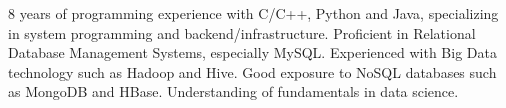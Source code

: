

\begin{cvparagraph}

8 years of programming experience with C/C++, Python and
Java, specializing in system programming and
backend/infrastructure. Proficient in Relational Database Management
Systems, especially MySQL. Experienced with Big Data technology such
as Hadoop and Hive. Good exposure to NoSQL databases such as MongoDB
and HBase. Understanding of fundamentals in data science.
\end{cvparagraph}
